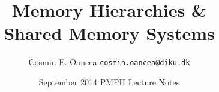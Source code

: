 \documentclass{beamer}
\title[Shared Memory Systems]{Memory Hierarchies \& \\Shared Memory Systems}
\author[C.~Oancea]{Cosmin E. Oancea {\tt cosmin.oancea@diku.dk}}
\institute{Department of Computer Science (DIKU)\\University of Copenhagen}
\date[Sept 2014]{September 2014 PMPH Lecture Notes}
\newcommand{\emp}[1]{\textcolor{DikuRed}{ #1}}
\begin{document}
\titleslide




\begin{frame}[fragile]
	\tableofcontents
\end{frame}

%
%
\end{document}
